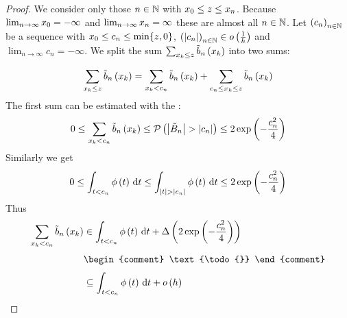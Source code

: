 \begin{proof}
  We consider only those $n\in\N$ with $\x[0] \le z \le \x[n]$. Because $\lim_{n\to\infty} \x[0] = -\infty$ and $\lim_{n\to\infty} \x[n] = \infty$ these are almost all $n\in\N$. Let $\seq{c_n}$ be a sequence with $\x[0] \le c_n \le \min\{z,0\}$, $\seq{\abs{c_n}}\in\littleo{\frac 1h}$ and $\lim_{n\to\infty} c_n=-\infty$. We split the sum $\sum_{\x \le z} \bb{\x}$ into two sums:

  \begin{align}
    \sum_{\x \le z} \bb{\x} = \sum_{\x < c_n} \bb{\x} + \sum_{c_n \le \x \le z} \bb{\x}
  \end{align}
  The first sum can be estimated with the :
  \begin{align}
    0 \le \sum_{\x < c_n} \bb{\x} \le \P{\abs{\BBs} > \abs{c_n}} \le 2\fexp{-\frac{c_n^2}{4}}
  \end{align}
  Similarly we get
  \begin{align}
    0 \le \int_{t < c_n} \fphi{t}\d{t} \le \int_{\abs{t} > \abs{c_n}} \fphi{t} \d{t} \le 2\fexp{-\frac{c_n^2}{4}}
  \end{align}
  Thus
  \begin{align}
    \sum_{\x < c_n} \bb{\x} & \in \int_{t < c_n} \fphi{t}\d{t} + \bigabs{2\fexp{-\frac{c_n^2}4}} \nl
    &
    \begin{comment}
      \text{\todo{}} 
    \end{comment} \nl
    & \subseteq \int_{t < c_n} \fphi{t}\d{t} + \littleo{h}
  \end{align}


\end{proof}
